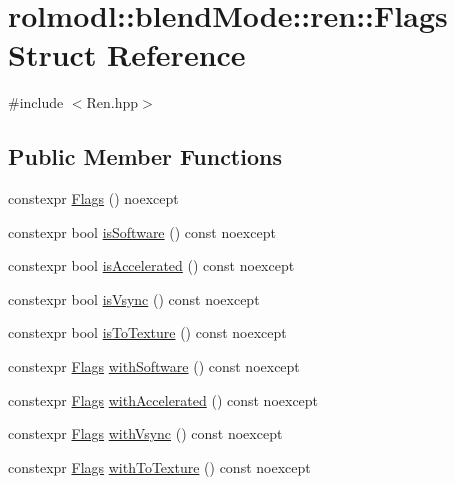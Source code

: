 \hypertarget{structrolmodl_1_1blend_mode_1_1ren_1_1_flags}{}\section{rolmodl\+::blend\+Mode\+::ren\+::Flags Struct Reference}
\label{structrolmodl_1_1blend_mode_1_1ren_1_1_flags}


{\ttfamily \#include $<$Ren.\+hpp$>$}

\subsection*{Public Member Functions}
\begin{DoxyCompactItemize}
\item 
constexpr \mbox{\hyperlink{structrolmodl_1_1blend_mode_1_1ren_1_1_flags_a442202586935b743657456ad19d7f5ab}{Flags}} () noexcept
\item 
constexpr bool \mbox{\hyperlink{structrolmodl_1_1blend_mode_1_1ren_1_1_flags_af3311b704a5d87078cb7b7a621162e88}{is\+Software}} () const noexcept
\item 
constexpr bool \mbox{\hyperlink{structrolmodl_1_1blend_mode_1_1ren_1_1_flags_ad17acc27ab00767ec842250049ce00d2}{is\+Accelerated}} () const noexcept
\item 
constexpr bool \mbox{\hyperlink{structrolmodl_1_1blend_mode_1_1ren_1_1_flags_aae4279279aef351e0d8442329b83d1ec}{is\+Vsync}} () const noexcept
\item 
constexpr bool \mbox{\hyperlink{structrolmodl_1_1blend_mode_1_1ren_1_1_flags_a3626cf88ee8484e3d498ccbb688165ec}{is\+To\+Texture}} () const noexcept
\item 
constexpr \mbox{\hyperlink{structrolmodl_1_1blend_mode_1_1ren_1_1_flags}{Flags}} \mbox{\hyperlink{structrolmodl_1_1blend_mode_1_1ren_1_1_flags_a54303f482f6adf2a2bd05f03cee191eb}{with\+Software}} () const noexcept
\item 
constexpr \mbox{\hyperlink{structrolmodl_1_1blend_mode_1_1ren_1_1_flags}{Flags}} \mbox{\hyperlink{structrolmodl_1_1blend_mode_1_1ren_1_1_flags_a1f7aa67e20eff57c306bef7d4444b907}{with\+Accelerated}} () const noexcept
\item 
constexpr \mbox{\hyperlink{structrolmodl_1_1blend_mode_1_1ren_1_1_flags}{Flags}} \mbox{\hyperlink{structrolmodl_1_1blend_mode_1_1ren_1_1_flags_a4f46047b69fbb8477a57f77700a92f3b}{with\+Vsync}} () const noexcept
\item 
constexpr \mbox{\hyperlink{structrolmodl_1_1blend_mode_1_1ren_1_1_flags}{Flags}} \mbox{\hyperlink{structrolmodl_1_1blend_mode_1_1ren_1_1_flags_ac6267b7a454ba636186bf26a2f7ca1b4}{with\+To\+Texture}} () const noexcept

\end{DoxyCompactItemize}
